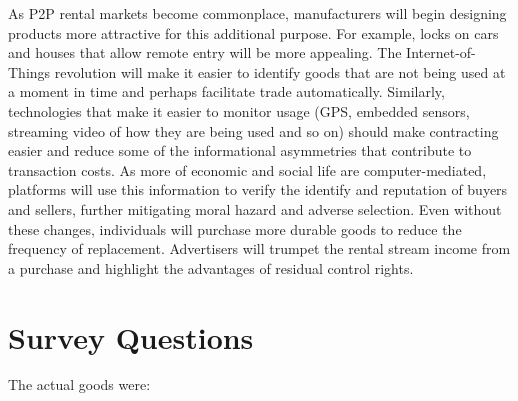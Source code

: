 \documentclass[11pt]{article}
\begin{document}
As P2P rental markets become commonplace, manufacturers will begin designing products more attractive for this additional purpose. 
For example, locks on cars and houses that allow remote entry will be more appealing. 
The Internet-of-Things revolution will make it easier to identify goods that are not being used at a moment in time and perhaps facilitate trade automatically. 
Similarly, technologies that make it easier to monitor usage (GPS, embedded sensors, streaming video of how they are being used and so on) should make contracting easier and reduce some of the informational asymmetries that contribute to transaction costs. 
As more of economic and social life are computer-mediated, platforms will use this information to verify the identify and reputation of buyers and sellers, further mitigating moral hazard and adverse selection.  
Even without these changes, individuals will purchase more durable goods to reduce the frequency of replacement. 
Advertisers will trumpet the rental stream income from a purchase and highlight the advantages of residual control rights. 






\newpage 

\appendix 

\section{Survey Questions \label{sec:survey}} 

The actual goods were: 
\end{document}
